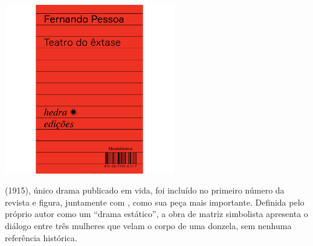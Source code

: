 \vfill

\hspace*{-.4cm}\begin{minipage}[c]{.6\linewidth}
\small{
{}}
\end{minipage}

\pagebreak %

\begin{center}
\hspace*{.5cm}\includegraphics[width=74mm]{./grid/pessoa.jpg}
\end{center}

\hspace*{-7cm}\hrulefill\hspace*{-7cm}

\medskip

\noindent{} 
{} (1915), único drama publicado em vida, foi incluído no
primeiro número da revista {} e figura, juntamente com
{}, como sua peça mais importante.  Definida pelo próprio autor
como um ``drama estático'', a obra de matriz simbolista apresenta o diálogo
entre três mulheres que velam o corpo de uma donzela, sem nenhuma referência
histórica.

